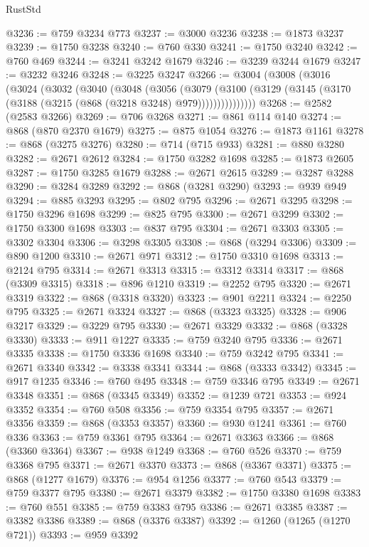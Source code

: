 \begin{lexlean}{RustStd}
\begin{coremodule}
@3236 := @759 @3234 @773
@3237 := @3000 @3236
@3238 := @1873 @3237
@3239 := @1750 @3238
@3240 := @760 @330
@3241 := @1750 @3240
@3242 := @760 @469
@3244 := @3241 @3242 @1679
@3246 := @3239 @3244 @1679
@3247 := @3232 @3246
@3248 := @3225 @3247
@3266 := @3004
    (@3008
      (@3016
        (@3024
          (@3032
            (@3040
              (@3048
                (@3056
                  (@3079
                    (@3100
                      (@3129 (@3145 (@3170 (@3188 (@3215 (@868 (@3218 @3248) @979)))))))))))))))
@3268 := @2582 (@2583 @3266)
@3269 := @706 @3268
@3271 := @861 @114 @140
@3274 := @868 (@870 @2370 @1679)
@3275 := @875 @1054
@3276 := @1873 @1161
@3278 := @868 (@3275 @3276)
@3280 := @714 (@715 @933)
@3281 := @880 @3280
@3282 := @2671 @2612
@3284 := @1750 @3282 @1698
@3285 := @1873 @2605
@3287 := @1750 @3285 @1679
@3288 := @2671 @2615
@3289 := @3287 @3288
@3290 := @3284 @3289
@3292 := @868 (@3281 @3290)
@3293 := @939 @949
@3294 := @885 @3293
@3295 := @802 @795
@3296 := @2671 @3295
@3298 := @1750 @3296 @1698
@3299 := @825 @795
@3300 := @2671 @3299
@3302 := @1750 @3300 @1698
@3303 := @837 @795
@3304 := @2671 @3303
@3305 := @3302 @3304
@3306 := @3298 @3305
@3308 := @868 (@3294 @3306)
@3309 := @890 @1200
@3310 := @2671 @971
@3312 := @1750 @3310 @1698
@3313 := @2124 @795
@3314 := @2671 @3313
@3315 := @3312 @3314
@3317 := @868 (@3309 @3315)
@3318 := @896 @1210
@3319 := @2252 @795
@3320 := @2671 @3319
@3322 := @868 (@3318 @3320)
@3323 := @901 @2211
@3324 := @2250 @795
@3325 := @2671 @3324
@3327 := @868 (@3323 @3325)
@3328 := @906 @3217
@3329 := @3229 @795
@3330 := @2671 @3329
@3332 := @868 (@3328 @3330)
@3333 := @911 @1227
@3335 := @759 @3240 @795
@3336 := @2671 @3335
@3338 := @1750 @3336 @1698
@3340 := @759 @3242 @795
@3341 := @2671 @3340
@3342 := @3338 @3341
@3344 := @868 (@3333 @3342)
@3345 := @917 @1235
@3346 := @760 @495
@3348 := @759 @3346 @795
@3349 := @2671 @3348
@3351 := @868 (@3345 @3349)
@3352 := @1239 @721
@3353 := @924 @3352
@3354 := @760 @508
@3356 := @759 @3354 @795
@3357 := @2671 @3356
@3359 := @868 (@3353 @3357)
@3360 := @930 @1241
@3361 := @760 @336
@3363 := @759 @3361 @795
@3364 := @2671 @3363
@3366 := @868 (@3360 @3364)
@3367 := @938 @1249
@3368 := @760 @526
@3370 := @759 @3368 @795
@3371 := @2671 @3370
@3373 := @868 (@3367 @3371)
@3375 := @868 (@1277 @1679)
@3376 := @954 @1256
@3377 := @760 @543
@3379 := @759 @3377 @795
@3380 := @2671 @3379
@3382 := @1750 @3380 @1698
@3383 := @760 @551
@3385 := @759 @3383 @795
@3386 := @2671 @3385
@3387 := @3382 @3386
@3389 := @868 (@3376 @3387)
@3392 := @1260 (@1265 (@1270 @721))
@3393 := @959 @3392

\end{coremodule}
\end{lexlean}
